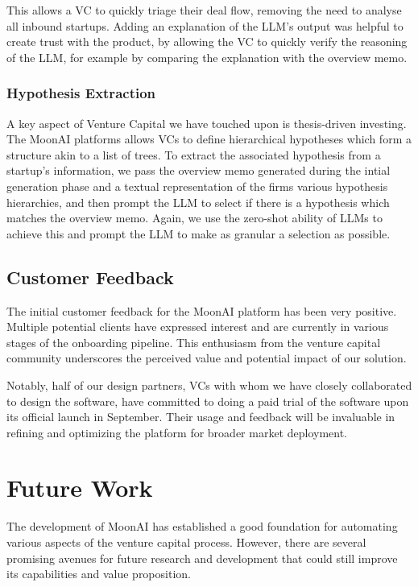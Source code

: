 \documentclass[a4paper, oneside]{discothesis}
\begin{document}
This allows a VC to quickly triage their deal flow, removing the need to analyse all inbound startups. Adding an explanation of the LLM's output was helpful to create trust with the product, by allowing the VC to quickly verify the reasoning of the LLM, for example by comparing the explanation with the overview memo. 

\subsubsection{Hypothesis Extraction}
A key aspect of Venture Capital we have touched upon is thesis-driven investing. The MoonAI platforms allows VCs to define hierarchical hypotheses which form a structure akin to a list of trees. To extract the associated hypothesis from a startup's information, we pass the overview memo generated during the intial generation phase and a textual representation of the firms various hypothesis hierarchies, and then prompt the LLM to select if there is a hypothesis which matches the overview memo. Again, we use the zero-shot  ability of LLMs to achieve this and prompt the LLM to make as granular a selection as possible. 

\subsection{Customer Feedback}

The initial customer feedback for the MoonAI platform has been very positive. Multiple potential clients have expressed interest and are currently in various stages of the onboarding pipeline. This enthusiasm from the venture capital community underscores the perceived value and potential impact of our solution.

Notably, half of our design partners, VCs with whom we have closely collaborated to design the software, have committed to doing a paid trial of the software upon its official launch in September. Their usage and feedback will be invaluable in refining and optimizing the platform for broader market deployment.

\section{Future Work}

The development of MoonAI has established a good foundation for automating various aspects of the venture capital process. However, there are several promising avenues for future research and development that could still improve its capabilities and value proposition.
\end{document}
